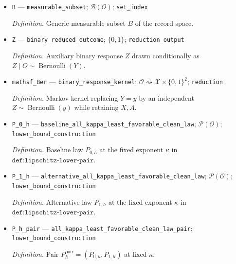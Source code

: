 \documentclass{article}
\begin{document}
\begin{itemize}
  \par\smallskip\noindent\emph{Definition.} Boundary modulus exponent \(\gamma_{\mathrm{TV}}=(\beta+1)/(\beta+\kappa+1)\).
  \item \texttt{B} --- \texttt{measurable\_\allowbreak{}subset}; \(\mathcal B(\mathcal O)\); \texttt{set\_\allowbreak{}index}
  \par\smallskip\noindent\emph{Definition.} Generic measurable subset \(B\) of the record space.
  \item \texttt{Z} --- \texttt{binary\_\allowbreak{}reduced\_\allowbreak{}outcome}; \(\{0,1\}\); \texttt{reduction\_\allowbreak{}output}
  \par\smallskip\noindent\emph{Definition.} Auxiliary binary response \(Z\) drawn conditionally as \(Z\mid O\sim\operatorname{Bernoulli}(Y)\).
  \item \texttt{mathsf\_\allowbreak{}Ber} --- \texttt{binary\_\allowbreak{}response\_\allowbreak{}kernel}; \(\mathcal O\rightsquigarrow\mathcal X\times\{0,1\}^2\); \texttt{reduction}
  \par\smallskip\noindent\emph{Definition.} Markov kernel replacing \(Y=y\) by an independent \(Z\sim\operatorname{Bernoulli}(y)\) while retaining \(X,A\).
  \item \texttt{P\_\allowbreak{}0\_\allowbreak{}h} --- \texttt{baseline\_\allowbreak{}all\_\allowbreak{}kappa\_\allowbreak{}least\_\allowbreak{}favorable\_\allowbreak{}clean\_\allowbreak{}law}; \(\mathcal P(\mathcal O)\); \texttt{lower\_\allowbreak{}bound\_\allowbreak{}construction}
  \par\smallskip\noindent\emph{Definition.} Baseline law \(P_{0,h}\) at the fixed exponent \(\kappa\) in \(\texttt{def:lipschitz-lower-pair}\).
  \item \texttt{P\_\allowbreak{}1\_\allowbreak{}h} --- \texttt{alternative\_\allowbreak{}all\_\allowbreak{}kappa\_\allowbreak{}least\_\allowbreak{}favorable\_\allowbreak{}clean\_\allowbreak{}law}; \(\mathcal P(\mathcal O)\); \texttt{lower\_\allowbreak{}bound\_\allowbreak{}construction}
  \par\smallskip\noindent\emph{Definition.} Alternative law \(P_{1,h}\) at the fixed exponent \(\kappa\) in \(\texttt{def:lipschitz-lower-pair}\).
  \item \texttt{P\_\allowbreak{}h\_\allowbreak{}pair} --- \texttt{all\_\allowbreak{}kappa\_\allowbreak{}least\_\allowbreak{}favorable\_\allowbreak{}clean\_\allowbreak{}law\_\allowbreak{}pair}; \texttt{lower\_\allowbreak{}bound\_\allowbreak{}construction}
  \par\smallskip\noindent\emph{Definition.} Pair \(P_h^{\mathrm{pair}}=(P_{0,h},P_{1,h})\) at fixed \(\kappa\).

\end{itemize}
\end{document}
